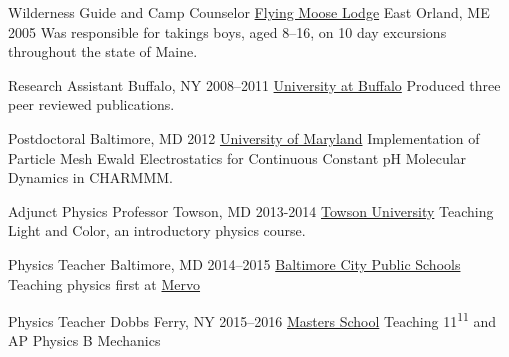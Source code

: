 


\begin{cventries}
  \cventry
    {Wilderness Guide and Camp Counselor} %
    {\href{www.flyingmooselodge.com}{Flying Moose Lodge}} %
    {East Orland, ME} %
    {2005} %
      {Was responsible for takings boys, aged 8--16, on 10 day excursions throughout the state of Maine.}

  \cventry
    {Research Assistant}
    {Buffalo, NY}
    {2008--2011}
    {\href{www.buffalo.edu}{University at Buffalo}}
	{Produced three peer reviewed publications.}


\cventry
    {Postdoctoral}
    {Baltimore, MD}
    {2012}
    {\href{www.umaryland.edu}{University of Maryland}}
    {Implementation of Particle Mesh Ewald Electrostatics for Continuous Constant pH Molecular Dynamics in CHARMMM.} %

\cventry
    {Adjunct Physics Professor}
    {Towson, MD}
    {2013-2014}
    {\href{www.towson.edu}{Towson University}}
    {Teaching Light and Color, an introductory physics course.}

\cventry
    {Physics Teacher}
    {Baltimore, MD}
    {2014--2015}
    {\href{http://www.baltimorecityschools.org/}{Baltimore City Public Schools}}
    {Teaching physics first at \href{http://mervo.org}{Mervo}}

\cventry
    {Physics Teacher}
    {Dobbs Ferry, NY}
    {2015--2016}
    {\href{mastersny.org}{Masters School}}
    {Teaching 11\textsuperscript{11} and AP Physics B Mechanics}


\end{cventries}
